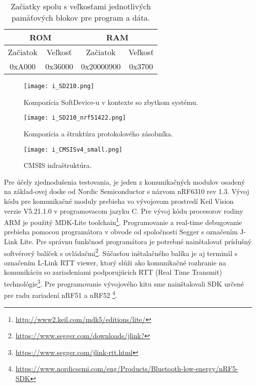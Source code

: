 \documentclass[12pt,a4paper,oneside,openright]{report}
\begin{document}
\begin{table}[h]
	\centering
	\caption{Začiatky spolu s veľkosťami jednotlivých pamäťových blokov pre program a dáta.}
	\label{t:s210_memory}
	\begin{tabular}{|c|c|c|c|}
		\hline
		\multicolumn{2}{|c|}{ROM} & \multicolumn{2}{c|}{RAM} \\ \hline
		Začiatok     & Veľkosť    & Začiatok     & Veľkosť   \\ \hline
		0xA000       & 0x36000    & 0x20000900   & 0x3700    \\ \hline
	\end{tabular}
\end{table}

\begin{figure*}[h]
	\centering
	\texttt{[image: i\_SD210.png]}
	\caption{Kompozícia SoftDevice-u v kontexte so zbytkom systému\cite{SD210}.}
	\label{f:o_SD210}
\end{figure*}

\begin{figure*}[h]
	\centering
	\texttt{[image: i\_SD210\_nrf51422.png]}
	\caption{Kompozícia a štruktúra protokolového zásobníka\cite{SD210}.}
	\label{f:o_SD210_alone}
\end{figure*}

\begin{figure*}[h]
	\centering
	\texttt{[image: i\_CMSISv4\_small.png]}
	\caption{CMSIS infraštruktúra\cite{CMSIS}.}
	\label{f:o_CMSIS}
\end{figure*}

Pre účely zjednodušenia testovania, je jeden z komunikačných modulov osadený na základ-ovej doske od Nordic Semiconductor s názvom nRF6310 rev 1.3.
Vývoj kódu pre komunikačné moduly prebieha vo vývojovom prostredí Keil {\textmu}Vision verzie V5.21.1.0 v programovacom jazyku C. Pre vývoj kódu procesorov rodiny ARM je použitý MDK-Lite toolchain\footnote{\url{http://www2.keil.com/mdk5/editions/lite/}}. 
Programovanie a real-time debugovanie prebieha pomocou programátora v obvode od spoločnosti Segger s označením J-Link Lite. Pre správnu funkčnosť programátora je potrebné nainštalovať príslušný softvérový balíček s ovládačmi\footnote{\url{https://www.segger.com/downloads/jlink?}}. Súčasťou inštalačného balíka je aj terminál s označením L-Link RTT viewer, ktorý slúži ako komunikačné rozhranie na komunikáciu so zariadeniami podporujúcich RTT (Real Time Transmit) technológie\footnote{\url{https://www.segger.com/jlink-rtt.html}}.
Pre programovanie vývojového kitu sme nainštalovali SDK určené pre radu zariadení nRF51 a nRF52 \footnote{\url{https://www.nordicsemi.com/eng/Products/Bluetooth-low-energy/nRF5-SDK}}.
\end{document}
